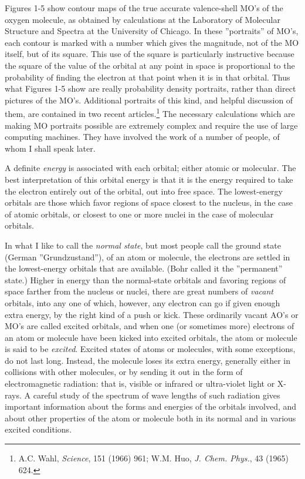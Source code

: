 \documentclass[11pt]{memoir}
\begin{document}
Figures 1-5 show contour maps of the true accurate valence-shell MO's of the oxygen molecule, as obtained by calculations at the Laboratory of Molecular Structure and Spectra at the University of Chicago.  In these ''portraits'' of MO's, each contour is marked with a number which gives the magnitude, not of the MO itself, but of its square.  This use of the square is particularly instructive because the square of the value of the orbital at any point in space is proportional to the probability of finding the electron at that point when it is in that orbital.  Thus what Figures 1-5 show are really probability density portraits, rather than direct pictures of the MO's.  Additional portraits of this kind, and helpful discussion of them, are contained in two recent articles.\footnote{A.C. Wahl, \emph{Science}, 151 (1966) 961; W.M. Huo, \emph{J. Chem. Phys.}, 43 (1965) 624.}  The necessary calculations which are making MO portraits possible are extremely complex and require the use of large computing machines.  They have involved the work of a number of people, of whom I shall speak later.

A definite \emph{energy} is associated with each orbital; either atomic or molecular.  The best interpretation of this orbital energy is that it is the energy required to take the electron entirely out of the orbital, out into free space.  The lowest-energy orbitals are those which favor regions of space closest to the nucleus, in the case of atomic orbitals, or closest to one or more nuclei in the case of molecular orbitals.

In what I like to call the \emph{normal state}, but most people call the ground state (German ''Grundzustand''), of an atom or molecule, the electrons are settled in the lowest-energy orbitals that are available.  (Bohr called it the ''permanent'' state.)  Higher in energy than the normal-state orbitals and favoring regions of space farther from the nucleus or nuclei, there are great numbers of \emph{vacant} orbitals, into any one of which, however, any electron can go if given enough extra energy, by the right kind of a push or kick.  These ordinarily vacant AO's or MO's are called excited orbitals, and when one (or sometimes more) electrons of an atom or molecule have been kicked into excited orbitals, the atom or molecule is said to be \emph{excited}.  Excited states of atoms or molecules, with some exceptions, do not last long.  Instead, the molecule loses its extra energy, generally either in collisions with other molecules, or by sending it out in the form of electromagnetic radiation: that is, visible or infrared or ultra-violet light or X-rays.  A careful study of the spectrum of wave lengths of such radiation gives important information about the forms and energies of the orbitals involved, and about other properties of the atom or molecule both in its normal and in various excited conditions.  
\end{document}
